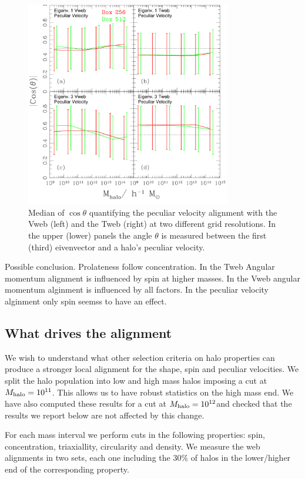 \documentclass[usenatbib]{mn2e}
\newcommand{\hMsun}{{\ifmmode{h^{-1}{\rm
        {M_{\odot}}}}\else{$h^{-1}{\rm{M_{\odot}}}$}\fi}}
\begin{document}
\begin{figure}
\includegraphics[width=0.80\textwidth]{Fig4.pdf}
\caption{Median of $\cos\theta$ quantifying the peculiar velocity
  alignment with the Vweb (left) and the Tweb (right) at two different
  grid resolutions. In the upper (lower)  panels the angle $\theta$ is
  measured between the first (third) eivenvector and a halo's peculiar
  velocity.} 
\end{figure}

Possible conclusion. Prolateness follow concentration. In the Tweb Angular momentum alignment is influenced by spin at higher masses. In the Vweb angular momentum alginment is influenced by all factors. In the peculiar velocity alginment only spin seemss to have an effect.

\subsection{What drives the alignment}

We wish to understand what other selection criteria on halo
properties can produce a stronger local alignment for the shape, spin
and peculiar velocities. We split the halo population into low and
high mass halos imposing a cut at $M_{\rm halo}=10^{11}$\hMsun. This
allows us to have robust statistics on the high mass end. We have also
computed these results for a cut at $M_{\rm halo}=10^{12}$\hMsun and
checked that the results we report below are not affected by this
change.

For each mass interval we perform cuts in the following properties:
spin, concentration, triaxiallity, circularity  and density. We
measure the web alignments in two sets, each one including the $30\%$
of halos in the lower/higher end of the corresponding property.
\end{document}
